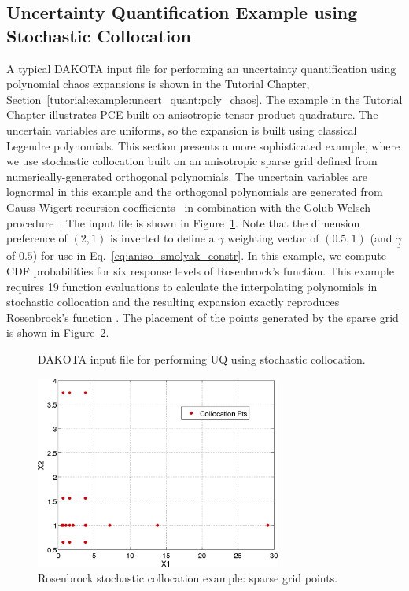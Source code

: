 \subsection{Uncertainty Quantification Example using Stochastic Collocation}\label{uq:uncertainty2}

A typical DAKOTA input file for performing an uncertainty
quantification using polynomial chaos expansions is shown in the
Tutorial Chapter,
Section~\ref{tutorial:example:uncert_quant:poly_chaos}.  The example
in the Tutorial Chapter illustrates PCE built on anisotropic tensor
product quadrature.  The uncertain variables are uniforms, so the
expansion is built using classical Legendre polynomials. This section
presents a more sophisticated example, where we use stochastic
collocation built on an anisotropic sparse grid defined from
numerically-generated orthogonal polynomials.  The uncertain variables
are lognormal in this example and the orthogonal polynomials are
generated from Gauss-Wigert recursion coefficients~\cite{simpson_gw}
in combination with the Golub-Welsch procedure~\cite{GolubWelsch69}.
The input file is shown in Figure~\ref{uq:figure11}. Note that the
dimension preference of $(2,1)$ is inverted to define a $\gamma$
weighting vector of $(0.5,1)$ (and $\underline{\gamma}$ of $0.5$) for
use in Eq.~\ref{eq:aniso_smolyak_constr}.  In this example, we compute
CDF probabilities for six response levels of Rosenbrock's function.
This example requires 19 function evaluations to calculate the
interpolating polynomials in stochastic collocation and the resulting
expansion exactly reproduces Rosenbrock's function .  The placement of
the points generated by the sparse grid is shown in
Figure~\ref{uq:figure11b}.

\begin{figure}
  \centering
  \begin{bigbox}
    \begin{small}
    \end{small}
  \end{bigbox}
\caption{DAKOTA input file for performing UQ using stochastic collocation.}
\label{uq:figure11}
\end{figure}

\begin{figure}[ht!]
  \centering
  \includegraphics[height=2.5in]{images/rosen_sc_pts}
  \caption{Rosenbrock stochastic collocation example: sparse grid points.}
  \label{uq:figure11b}
\end{figure}

